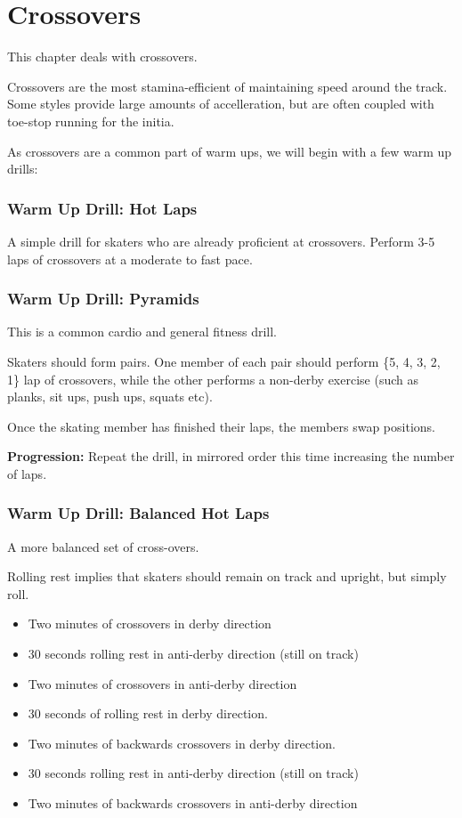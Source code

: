 \chapter{Crossovers}
\label{ch:crossovers}

This chapter deals with crossovers.

Crossovers are the most stamina-efficient of maintaining speed around the track.     
Some styles provide large amounts of accelleration, but are often coupled with toe-stop running for the initia.


As crossovers are a common part of warm ups, we will begin with a few warm up drills:


\subsection*{Warm Up Drill: Hot Laps}
A simple drill for skaters who are already proficient at crossovers.
Perform 3-5 laps of crossovers at a moderate to fast pace.


\subsection*{Warm Up Drill: Pyramids}
This is a common cardio and general fitness drill.

Skaters should form pairs.
One member of each pair should perform \{5, 4, 3, 2, 1\} lap of crossovers, while the other performs a non-derby exercise (such as planks, sit ups, push ups, squats etc).    

Once the skating member has finished their laps, the members swap positions.


{\bf Progression:}
Repeat the drill, in mirrored order this time increasing the number of laps.


\subsection*{Warm Up Drill: Balanced Hot Laps}
A more balanced set of cross-overs.

Rolling rest implies that skaters should remain on track and upright, but simply roll.

\begin{itemize}
\item Two minutes of crossovers in derby direction
\item 30 seconds rolling rest in anti-derby direction (still on track)
\item Two minutes of crossovers in anti-derby direction
\item 30 seconds of rolling rest in derby direction.
\item Two minutes of backwards crossovers in derby direction. 
\item 30 seconds rolling rest in anti-derby direction (still on track)
\item Two minutes of backwards crossovers in anti-derby direction
\end{itemize}


